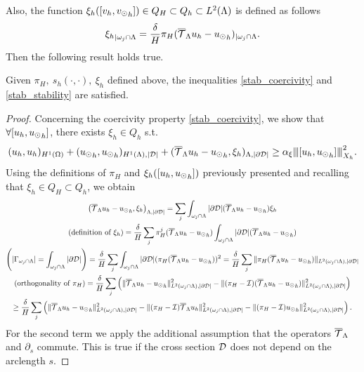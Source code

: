 Also, the function $\xi_h([v_h, {v_{\odot}}_h]) \in Q_H \subset Q_h \subset L^2(\Lambda)$ is defined as follows
\begin{equation*}
{\xi_h}_{|\omega _j\cap \Lambda}=\frac{\delta}{H} \pi_H({\overline{\mathcal{T}}_\Lambda} u_h-{u_{\odot}}_h)_{|\omega _j \cap \Lambda}.
\end{equation*}
Then the following result holds true. 
\begin{lemma}
Given $\pi_H,\ s_h(\cdot,\cdot), \ \xi_h$ defined above, the inequalities \eqref{stab_coercivity} and \eqref{stab_stability} are satisfied.
\end{lemma}
\begin{proof} 
Concerning the coercivity property \eqref{stab_coercivity}, we show that $\forall [u_h, {u_{\odot}}_h]$, there exists $\xi_h \in Q_h$ s.t.
\begin{equation*}
(u_h,u_h)_{H^1(\Omega)}+ ({u_{\odot}}_h, {u_{\odot}}_h)_{H^1(\Lambda), |\mathcal{D}|} +   ({\overline{\mathcal{T}}_\Lambda} u_h - {u_{\odot}}_h, \xi_h)_{\Lambda,|\partial\mathcal{D}|} \geq \alpha_{\xi}{\left\vert\kern-0.25ex\left\vert\kern-0.25ex\left\vert [u_h, {u_{\odot}}_h] \right\vert\kern-0.25ex\right\vert\kern-0.25ex\right\vert}^2_{X_h}.
\end{equation*}
Using the definitions of $\pi_H$ and $\xi_h([u_h, {u_{\odot}}_h])$ previously presented and recalling that $\xi_h\in Q_H \subset Q_h$, we obtain
\begin{multline*}
\left( {\overline{\mathcal{T}}_\Lambda} u_h - {u_{\odot}}_h, \xi _h \right)_{\Lambda,|\partial\mathcal{D}|} 
= \sum_j \int_{\omega _j\cap \Lambda} |\partial\mathcal{D}|({\overline{\mathcal{T}}_\Lambda} u_h - {u_{\odot}}_h)\xi_h
\\
(\text{definition of $\xi_h$})= \frac{\delta}{H}\sum_j \pi_H^j( {\overline{\mathcal{T}}_\Lambda} u_h - {u_{\odot}}_h)\int_{\omega _j\cap \Lambda} |\partial\mathcal{D}|({\overline{\mathcal{T}}_\Lambda} u_h - {u_{\odot}}_h)
\\
\left(|\Gamma_{\omega_j \cap \Lambda}| = \int_{\omega_j \cap \Lambda}|\partial\mathcal{D}|\right)= \frac{\delta}{H} \sum_j \int_{\omega _j\cap \Lambda}|\partial\mathcal{D}| (\pi_H( {\overline{\mathcal{T}}_\Lambda} u_h - {u_{\odot}}_h) )^2
= \frac{\delta}{H}\sum_j \|\pi_H( {\overline{\mathcal{T}}_\Lambda} u_h - {u_{\odot}}_h)\|_{L^2(\omega _j\cap \Lambda),|\partial\mathcal{D}|}
\\
(\text{orthogonality of $\pi_H$}) = \frac{\delta}{H} \sum_j \left( \|{\overline{\mathcal{T}}_\Lambda} u_h - {u_{\odot}}_h\|^2_{L^2(\omega _j\cap \Lambda),|\partial\mathcal{D}|} - \|(\pi_H-\mathcal{I})({\overline{\mathcal{T}}_\Lambda} u_h - {u_{\odot}}_h)\|^2_{L^2(\omega _j\cap \Lambda),|\partial\mathcal{D}|} \right) 
\\ 
\geq \frac{\delta}{H} \sum_j \left(
\|{\overline{\mathcal{T}}_\Lambda} u_h-{u_{\odot}}_h\|^2_{L^2(\omega _j\cap \Lambda),|\partial\mathcal{D}|}
- \|(\pi_H - \mathcal{I}){\overline{\mathcal{T}}_\Lambda} u_h\|^2_{L^2(\omega _j\cap \Lambda), |\partial\mathcal{D}|}
- \|(\pi_H - \mathcal{I}){u_{\odot}}_h\|^2_{L^2(\omega _j\cap \Lambda),|\partial\mathcal{D}|} \right). 
\end{multline*}
For the second term we apply the additional assumption that the operators ${\overline{\mathcal{T}}_\Lambda}$ and $\partial_s$ commute. This is true if the cross section $\mathcal{D}$ does not depend on the arclength $s$.

\end{proof}

